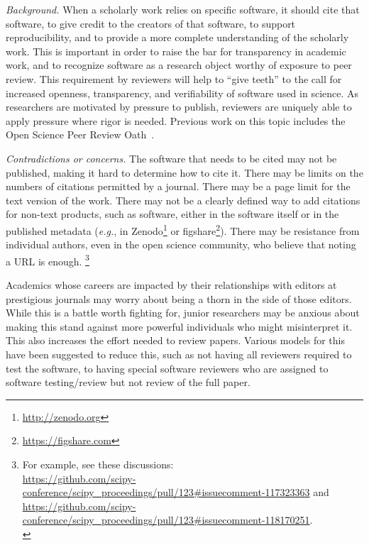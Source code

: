 \documentclass[a4paper,UKenglish]{dagman}
\newcommand{\eg}{\emph{e.g.},\xspace}
\begin{document}
\emph{Background.} When a scholarly work relies on specific software, it should cite that software, to give credit to the creators of that software, to support reproducibility, and to provide a more complete understanding of the scholarly work.
This is important in order to raise the bar for transparency in academic work, and to recognize software as a research object worthy of exposure to peer review. This requirement by reviewers will help to ``give teeth'' to the call for increased openness, transparency, and verifiability of software used in science. As researchers are motivated by pressure to publish, reviewers are uniquely able to apply pressure where rigor is needed. Previous work on this topic includes the Open Science Peer Review Oath~\cite{aleksic_open_2015}.

\emph{Contradictions or concerns.} The software that needs to be cited may not be published, making it hard to determine how to cite it.  There may be limits on the numbers of citations permitted by a journal.  There may be a page limit for the text version of the work.  There may not be a clearly defined way to add citations for non-text products, such as software, either in the software itself or in the published metadata (\eg in Zenodo\footnote{\url{http://zenodo.org} } or figshare\footnote{\url{https://figshare.com}}).
There may be resistance from individual authors, even in the open science community, who believe that noting a URL is enough.%
\footnote{For example, see these discussions:\\
\url{https://github.com/scipy-conference/scipy_proceedings/pull/123\#issuecomment-117323363} and\\
\url{https://github.com/scipy-conference/scipy_proceedings/pull/123\#issuecomment-118170251}.\\
}

Academics whose careers are impacted by their relationships with editors at prestigious journals may worry about being a thorn in the side of those editors. While this is a battle worth fighting for, junior researchers may be anxious about making this stand against more powerful individuals who might misinterpret it. 
This also increases the effort needed to review papers.  Various models for this have been suggested to reduce this, such as not having all reviewers required to test the software, to having special software reviewers who are assigned to software testing/review but not review of the full paper.
\end{document}
